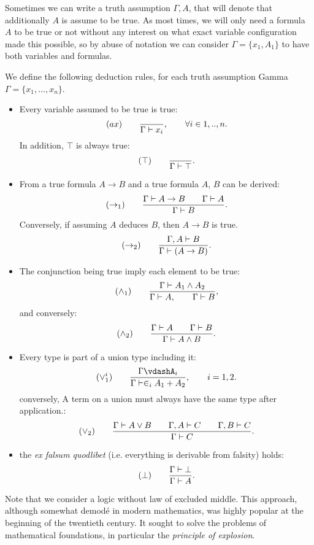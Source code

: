 Sometimes we can write a truth assumption $\Gamma, A$, that will denote that additionally $A$ is assume to be true. As most times, we will only need a formula $A$ to be true or not without any interest on what exact variable configuration made this possible, so by abuse of notation we can consider $\Gamma = \{x_1,A_1\}$ to have both variables and formulas.  
\begin{definition}
  We define the following deduction rules, for each truth assumption Gamma $\Gamma=\{x_1,...,x_n\}$.
  \begin{itemize}
  \item Every variable assumed to be true is true:
    $$  (ax)\qquad  {\displaystyle \over \Gamma \vdash x_i},\qquad \forall i \in 1,..,n.$$
    In addition, $\top$ is always true:
    $$  (\top)\qquad  {\displaystyle \over \Gamma \vdash \top}.$$
  \item From a true formula $A\to B$ and a true formula $A$, $B$ can be derived:
    $$(\to_1)\qquad  {\displaystyle \Gamma \vdash A\to B\qquad \Gamma \vdash A      \over \Gamma \vdash B}.$$
    Conversely, if assuming $A$ deduces $B$, then $A\to B$ is true.
    $$(\to_2)\qquad  {\displaystyle \Gamma, A \vdash B      \over \Gamma \vdash (A\to B)}.$$
    
  \item The conjunction being true imply each element to be true:
    $$(\land_1) \qquad {\displaystyle \Gamma\vdash A_1\land A_2 \over \Gamma \vdash A, \qquad \Gamma \vdash B },$$
    and conversely:
    $$(\land_2) \qquad {\displaystyle \Gamma\vdash A\qquad \Gamma\vdash B \over \Gamma \vdash  A \land B}.$$
  \item Every type is part of a union type including it:
    $$  (\lor_1^i)\qquad  {\displaystyle\Gamma \vdashA_i \over \Gamma \vdash \in_i A_1+A_2},\qquad  i=  1,2.$$
    conversely, A term on a union must always have the same type after application.:
    $$(\lor_2) \qquad {\displaystyle \Gamma\vdash A\lor B\qquad \Gamma, A\vdash C\qquad \Gamma, B\vdash C \over \Gamma \vdash C}.$$
  \item the \emph{ex falsum quodlibet} (i.e. everything is derivable from falsity)  holds:
    $$  (\bot)\qquad  {\displaystyle\Gamma \vdash \bot \over \Gamma \vdash A}.$$ 

  \end{itemize}
\end{definition}



Note that we consider a logic without law of excluded middle. This approach, although somewhat demodé in modern mathematics, was highly popular at the beginning of the twentieth century. It sought to solve the problems of mathematical foundations, in particular the \emph{principle of explosion}. \\


